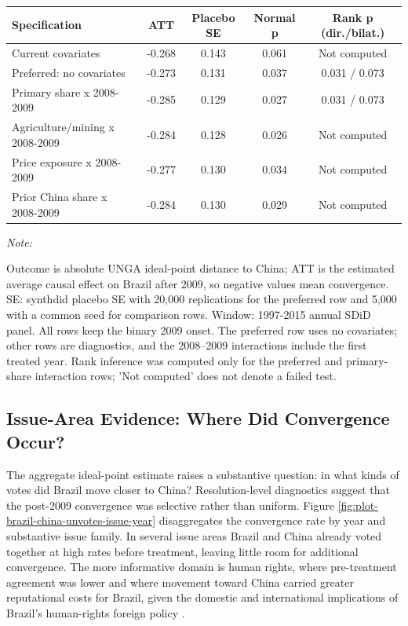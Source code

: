 \documentclass[referee,pdflatex,sn-basic]{sn-jnl}
\renewenvironment{table}[1][]{\tableorg[#1]}{\endtableorg\normalfont}
\theoremstyle{thmstylethree}
\begin{document}
\begin{table}[H]
\centering
\caption{\label{tab:china-demand-sdid-diagnostics}Brazil SDiD estimates under corrected predetermined commodity and China-demand diagnostics.}
\centering
\fontsize{9}{11}\selectfont
\begin{threeparttable}
\begin{tabular}[t]{lcccc}
\toprule
Specification & ATT & Placebo SE & Normal p & Rank p (dir./bilat.)\\
\midrule
Current covariates & -0.268 & 0.143 & 0.061 & Not computed\\
Preferred: no covariates & -0.273 & 0.131 & 0.037 & 0.031 / 0.073\\
Primary share x 2008-2009 & -0.285 & 0.129 & 0.027 & 0.031 / 0.073\\
Agriculture/mining x 2008-2009 & -0.284 & 0.128 & 0.026 & Not computed\\
Price exposure x 2008-2009 & -0.277 & 0.130 & 0.034 & Not computed\\
\addlinespace
Prior China share x 2008-2009 & -0.284 & 0.130 & 0.029 & Not computed\\
\bottomrule
\end{tabular}
\begin{tablenotes}
\item \textit{Note: } 
\item Outcome is absolute UNGA ideal-point distance to China; ATT is the estimated average causal effect on Brazil after 2009, so negative values mean convergence. SE: synthdid placebo SE with 20,000 replications for the preferred row and 5,000 with a common seed for comparison rows. Window: 1997-2015 annual SDiD panel. All rows keep the binary 2009 onset. The preferred row uses no covariates; other rows are diagnostics, and the 2008--2009 interactions include the first treated year. Rank inference was computed only for the preferred and primary-share interaction rows; 'Not computed' does not denote a failed test.
\end{tablenotes}
\end{threeparttable}
\end{table}

\subsection{Issue-Area Evidence: Where Did Convergence Occur?}\label{issue-area-evidence-where-did-convergence-occur}

The aggregate ideal-point estimate raises a substantive question: in what kinds of votes did Brazil move closer to China? Resolution-level diagnostics suggest that the post-2009 convergence was selective rather than uniform. Figure \ref{fig:plot-brazil-china-unvotes-issue-year} disaggregates the convergence rate by year and substantive issue family. In several issue areas Brazil and China already voted together at high rates before treatment, leaving little room for additional convergence. The more informative domain is human rights, where pre-treatment agreement was lower and where movement toward China carried greater reputational costs for Brazil, given the domestic and international implications of Brazil's human-rights foreign policy \citep{milani2015humanrights}.
\end{document}
